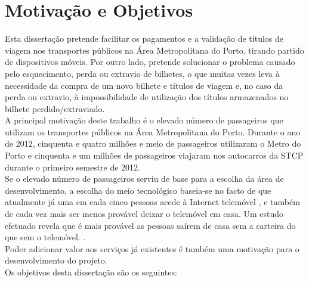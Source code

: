 \section{Motivação e Objetivos} \label{sec:goals}

Esta dissertação pretende facilitar os pagamentos e a validação de títulos de viagem nos transportes públicos na Área Metropolitana do Porto, tirando partido de dispositivos móveis. Por outro lado, pretende solucionar o problema causado pelo esquecimento, perda ou extravio de bilhetes, o que muitas vezes leva à necessidade da compra de um novo bilhete e títulos de viagem e, no caso da perda ou extravio, à impossibilidade de utilização dos títulos armazenados no bilhete perdido/extraviado.
\\A principal motivação deste trabalho é o elevado número de passageiros que utilizam os transportes públicos na Área Metropolitana do Porto. Durante o ano de 2012, cinquenta e quatro milhões e meio de passageiros utilizaram o Metro do Porto \cite{INE20130528} e cinquenta e um milhões de passageiros viajaram nos autocarros da STCP durante o primeiro semestre de 2012. \cite{CMVM}
\\Se o elevado número de passageiros serviu de base para a escolha da área de desenvolvimento, a escolha do meio tecnológico baseia-se no facto de que atualmente já uma em cada cinco pessoas acede à Internet  telemóvel \cite{INE20121106}, e também de cada vez mais ser menos provável deixar o telemóvel em casa. Um estudo efetuado revela que é mais provável as pessoas saírem de casa sem a carteira do que sem o telemóvel. \cite{NFCForum2011}.
\\Poder adicionar valor aos serviços já existentes é também uma motivação para o desenvolvimento do projeto.
\\Os objetivos desta dissertação são os seguintes:
